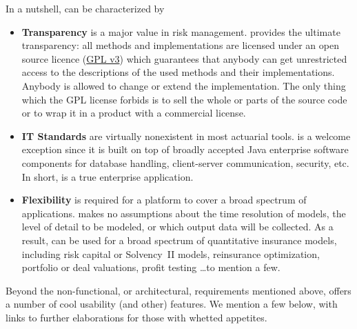 In a nutshell, \PO{} can be characterized by
\begin{itemize}
  \item {\bf Transparency} is a major value in risk management. \PO{} provides the ultimate transparency: all methods and implementations are licensed under an open source licence (\href{http://www.gnu.org/licenses/gpl-3.0.html}{GPL v3}) which guarantees that anybody can get unrestricted access to the descriptions of the used methods and their implementations. Anybody is allowed to change or extend the implementation. The only thing which the GPL license forbids is to sell the whole or parts of the source code or to wrap it in a product with a commercial license. 
  \item {\bf IT Standards} are virtually nonexistent in most actuarial tools. \PO{} is a welcome exception since it is built on top of broadly accepted Java enterprise software components for database handling, client-server communication, security, etc. In short, \RA{} is a true enterprise application.
  \item {\bf Flexibility} is required for a platform to cover a broad spectrum of applications. \RA{} makes no assumptions about the time resolution of models, the level of detail to be modeled, or which output data will be collected. As a result, \RA{} can be used for a broad spectrum of quantitative insurance models, including risk capital or Solvency~II models, reinsurance optimization, portfolio or deal valuations, profit testing \ldots to mention a few.
\end{itemize}

Beyond the non-functional, or architectural, requirements mentioned above, \RA{} offers a number of cool usability (and other) features. We mention a few below, with links to further elaborations for those with whetted appetites.

